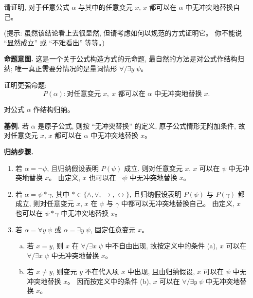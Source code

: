 \documentclass[a4paper, justified]{tufte-handout}
\newenvironment{intention}
  {\par\smallskip\noindent\textbf{命题意图. }\ignorespaces}
  {\par\smallskip}
\begin{document}
\newpage
\begin{problem}[一阶谓词逻辑: 替换]
  请证明, 对于任意公式 $\alpha$ 与其中的任意变元 $x$,
  $x$ 都可以在 $\alpha$ 中无冲突地替换自己。

  \noindent (提示: 虽然该结论看上去很显然, 但请考虑如何以规范的方式证明它。
  你不能说 ``显然成立'' 或 ``不难看出'' 等等。)
\end{problem}

\begin{solution}
  \begin{intention}
    这是一个关于公式构造方式的元命题, 最自然的方法是对公式作结构归纳; 唯一真正需要分情况的是量词情形 $\forall/\exists y\; \psi$。
  \end{intention}

  证明更强命题:
  \[
    P(\alpha): \text{对任意变元 } x,\; x \text{ 都可以在 } \alpha \text{ 中无冲突地替换 } x.
  \]

  对公式 $\alpha$ 作结构归纳。

  \textbf{基例.}
  若 $\alpha$ 是原子公式, 则按 ``无冲突替换'' 的定义,
  原子公式情形无附加条件, 故对任意变元 $x$,
  $x$ 都可以在 $\alpha$ 中无冲突地替换 $x$。

  \textbf{归纳步骤.}

  \begin{enumerate}[(1)]
    \item 若 $\alpha = \lnot \psi$,
      且归纳假设表明 $P(\psi)$ 成立,
      则对任意变元 $x$,
      $x$ 可以在 $\psi$ 中无冲突地替换 $x$。
      由定义,
      $x$ 也可以在 $\lnot \psi$ 中无冲突地替换 $x$。

    \item 若 $\alpha = \psi \ast \gamma$,
      其中 $\ast \in \{\land, \lor, \to, \leftrightarrow\}$,
      且归纳假设表明 $P(\psi)$ 与 $P(\gamma)$ 都成立,
      则对任意变元 $x$,
      $x$ 在 $\psi$ 与 $\gamma$ 中都可以无冲突地替换自己。
      由定义,
      $x$ 也可以在 $\psi \ast \gamma$ 中无冲突地替换 $x$。

    \item 若 $\alpha = \forall y\; \psi$ 或 $\alpha = \exists y\; \psi$,
      固定任意变元 $x$。

      \begin{enumerate}[(a)]
        \item 若 $x = y$, 则 $x$ 在 $\forall/\exists x\; \psi$ 中不自由出现,
          故按定义中的条件 (a),
          $x$ 可以在 $\forall/\exists x\; \psi$ 中无冲突地替换 $x$。

        \item 若 $x \neq y$, 则变元 $y$ 不在代入项 $x$ 中出现,
          且由归纳假设, $x$ 可以在 $\psi$ 中无冲突地替换 $x$。
          因而按定义中的条件 (b),
          $x$ 可以在 $\forall/\exists y\; \psi$ 中无冲突地替换 $x$。
      \end{enumerate}
  \end{enumerate}


\end{solution}
\end{document}
